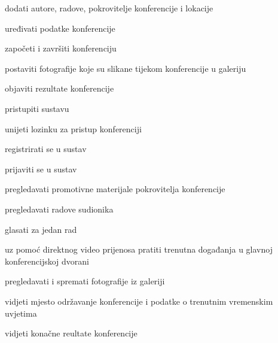 			
			\begin{packed_enum}
				\item  {}
				
				\begin{packed_enum}
					
					\item dodati autore, radove, pokrovitelje konferencije i lokacije
					\item uređivati podatke konferencije
					\item započeti i završiti konferenciju
					\item postaviti fotografije koje su slikane tijekom konferencije u galeriju
					\item objaviti rezultate konferencije
					
				\end{packed_enum}
			
				\item  {}
				
				\begin{packed_enum}
					
					\item pristupiti sustavu
					\item unijeti lozinku za pristup konferenciji
					\item registrirati se u sustav
					
				\end{packed_enum}
				
				\item  {}
				
				\begin{packed_enum}
					
					\item prijaviti se u sustav
					\item pregledavati promotivne materijale pokrovitelja konferencije
					\item pregledavati radove sudionika
					\item glasati za jedan rad
					\item uz pomoć direktnog video prijenosa pratiti trenutna događanja u glavnoj konferencijskoj dvorani
					\item pregledavati i spremati fotografije iz galeriji
					\item vidjeti mjesto održavanje konferencije i podatke o trenutnim vremenskim uvjetima
					\item vidjeti konačne reultate konferencije
					

\end{packed_enum}
\end{packed_enum}
